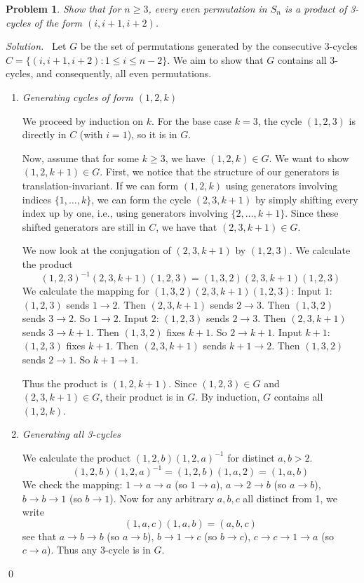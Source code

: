 \documentclass[12pt,a4paper]{article}
\newenvironment{solution}{%
  \par\noindent\textit{Solution.}\ }{\qed}
\theoremstyle{problemstyle}
\newtheorem{problem}{Problem}[section]
\begin{document}
\begin{problem}\label{prob:1.4}
    Show that for $n \ge 3$, every even permutation in $S_n$ is a product of 3-cycles of the form $(i, i+1, i+2)$.
\end{problem}
\begin{solution}
    Let $G$ be the set of permutations generated by the consecutive 3-cycles $C = \{ (i, i+1, i+2) : 1 \le i \le n-2 \}$. We aim to show that $G$ contains all 3-cycles, and consequently, all even permutations.
    
    \begin{enumerate}[label=\Roman*.]
    \item \textit{Generating cycles of form $(1, 2, k)$}
    
    We proceed by induction on $k$.
    For the base case $k=3$, the cycle $(1, 2, 3)$ is directly in $C$ (with $i=1$), so it is in $G$.
    
    Now, assume that for some $k \ge 3$, we have $(1, 2, k) \in G$. We want to show $(1, 2, k+1) \in G$.
    First, we notice that the structure of our generators is translation-invariant. If we can form $(1, 2, k)$ using generators involving indices $\{1, \dots, k\}$, we can form the cycle $(2, 3, k+1)$ by simply shifting every index up by one, i.e., using generators involving $\{2, \dots, k+1\}$. Since these shifted generators are still in $C$, we have that $(2, 3, k+1) \in G$.
    
    We now look at the conjugation of $(2, 3, k+1)$ by $(1, 2, 3)$. We calculate the product
    $$ (1, 2, 3)^{-1} (2, 3, k+1) (1, 2, 3) = (1, 3, 2)(2, 3, k+1)(1, 2, 3) $$
    We calculate the mapping for $(1,3,2)(2,3,k+1)(1,2,3)$:
    Input $1$: $(1,2,3)$ sends $1 \to 2$. Then $(2,3,k+1)$ sends $2 \to 3$. Then $(1,3,2)$ sends $3 \to 2$. So $1 \to 2$.
    Input $2$: $(1,2,3)$ sends $2 \to 3$. Then $(2,3,k+1)$ sends $3 \to k+1$. Then $(1,3,2)$ fixes $k+1$. So $2 \to k+1$.
    Input $k+1$: $(1,2,3)$ fixes $k+1$. Then $(2,3,k+1)$ sends $k+1 \to 2$. Then $(1,3,2)$ sends $2 \to 1$. So $k+1 \to 1$.
    
    Thus the product is $(1, 2, k+1)$. Since $(1, 2, 3) \in G$ and $(2, 3, k+1) \in G$, their product is in $G$. By induction, $G$ contains all $(1, 2, k)$.
    
    \item \textit{Generating all 3-cycles}
    
    We calculate the product $(1, 2, b)(1, 2, a)^{-1}$ for distinct $a, b > 2$.
    $$(1, 2, b)(1, 2, a)^{-1} = (1, 2, b)(1, a, 2) = (1, a, b)$$
    We check the mapping: $1 \to a \to a$ (so $1 \to a$), $a \to 2 \to b$ (so $a \to b$), $b \to b \to 1$ (so $b \to 1$).
    Now for any arbitrary $a, b, c$ all distinct from 1, we write
    $$(1, a, c)(1, a, b) = (a, b, c)$$
    see that $a \to b \to b$ (so $a \to b$), $b \to 1 \to c$ (so $b \to c$), $c \to c \to 1 \to a$ (so $c \to a$).
    Thus any 3-cycle is in $G$.
    

\end{enumerate}
\end{solution}
\end{document}
